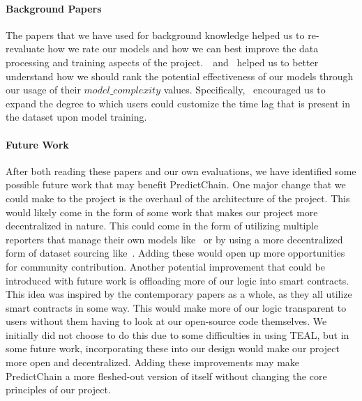 \documentclass{article}
\begin{document}
    \paragraph{Background Papers}
    The papers that we have used for background knowledge helped us to re-revaluate how we rate our models and how we can best
    improve the data processing and training aspects of the project.~\cite{LSTM}~and~\cite{recurrentModeling} helped
    us to better understand how we should rank the potential effectiveness of our models through our usage of
    their $model\_complexity$ values.  Specifically,~\cite{LSTM} encouraged us to expand the degree to
    which users could customize the time lag that is present in the dataset upon model training.

    \paragraph{Future Work}
    After both reading these papers and our own evaluations, we have identified some possible future work that may
    benefit PredictChain.  One major change that we could make to the project is the overhaul of the architecture of
    the project.  This would likely come in the form of some work that makes our project more decentralized in nature.
    This could come in the form of utilizing multiple reporters that manage their own models like~\cite{windForcasting}
    or by using a more decentralized form of dataset sourcing like~\cite{priceOfTrust}.  Adding these would open up more
    opportunities for community contribution.  Another potential improvement that could be introduced with future work is
    offloading more of our logic into smart contracts.  This idea was inspired by the contemporary papers as a whole, as
    they all utilize smart contracts in some way.  This would make more of our logic transparent to users without them having
    to look at our open-source code themselves.  We initially did not choose to do this due to some difficulties in using TEAL,
    but in some future work, incorporating these into our design would make our project more open and decentralized.
    Adding these improvements may make PredictChain a more fleshed-out version of itself without changing the core
    principles of our project.

    \pagebreak
    
    
\end{document}
